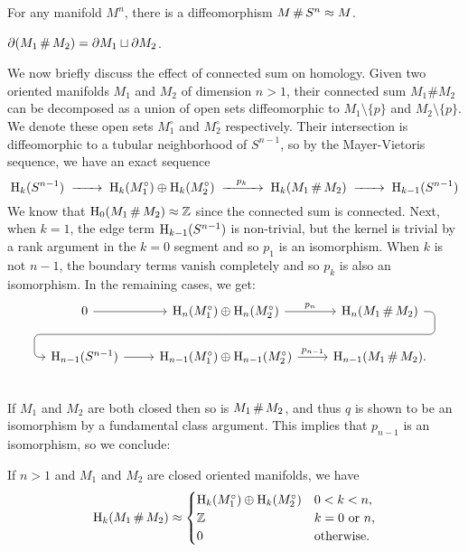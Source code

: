 \begin{corollary}
	For any manifold $M^n$, there is a diffeomorphism $M\+ S^n\cong M$.
\end{corollary}

\begin{corollary}
	$\partial(M_1\+M_2) = \partial M_1\sqcup \partial M_2$.
\end{corollary}

We now briefly discuss the effect of connected sum on homology. Given two oriented manifolds $M_1$ and $M_2$ of dimension $n>1$, their connected sum $M_1\# M_2$ can be decomposed as a union of open sets diffeomorphic to $M_1\setminus\{p\}$ and $M_2\setminus\{p\}$. We denote these open sets $M_1^\circ$ and $M_2^\circ$ respectively. Their intersection is diffeomorphic to a tubular neighborhood of $S^{n-1}$, so by the Mayer-Vietoris sequence, we have an exact sequence
\[
	\H_k(S^{n-1})\lkxto \H_k(M_1^\circ)\oplus \H_k(M_2^\circ)\lkxto[p_k] \H_k(M_1\+M_2)\lkxto \H_{k-1}(S^{n-1})
\]
We know that $\H_0(M_1\+ M_2)\cong \Z$ since the connected sum is connected. Next, when $k=1$, the edge term $\operatorname{H}_{k-1}(S^{n-1})$ is non-trivial, but the kernel is trivial by a rank argument in the $k=0$ segment and so $p_1$ is an isomorphism.
When $k$ is not $n-1$, the boundary terms vanish completely and so $p_k$ is also an isomorphism. In the remaining cases, we get:
\begin{equation}\label{eq:connected-sum-cohomology}
	\begin{tikzcd}
		0\rar & {\H_n(M_1^\circ)\oplus \H_n(M_2^\circ)} \rar{p_n}\snakenode{X} & {\H_n(M_1\+M_2)}\snakearrow{X} \\
		\H_{n-1}(S^{n-1}) \rar & {\H_{n-1}(M_1^\circ)\oplus \H_{n-1}(M_2^\circ)}\rar{p_{n-1}} & {\H_{n-1}(M_1\+M_2).} \\
\end{tikzcd}
\end{equation}
If $M_1$ and $M_2$ are both closed then so is $M_1\+M_2$, and thus $q$ is shown to be an isomorphism by a fundamental class argument. This implies that $p_{n-1}$ is an isomorphism, so we conclude:

\begin{proposition}\label{prop:homology-connected-sum-closed}
	If $n>1$ and $M_1$ and $M_2$ are closed oriented manifolds, we have
	\[
		\H_k(M_1\+M_2) \cong \begin{cases}
			\H_k(M_1^\circ)\oplus \H_k(M_2^\circ) & 0 < k < n,\\
			\Z & k=0\textrm{ or }n,\\
			0 & \textrm{otherwise.}
		\end{cases}
	\]
\end{proposition}


